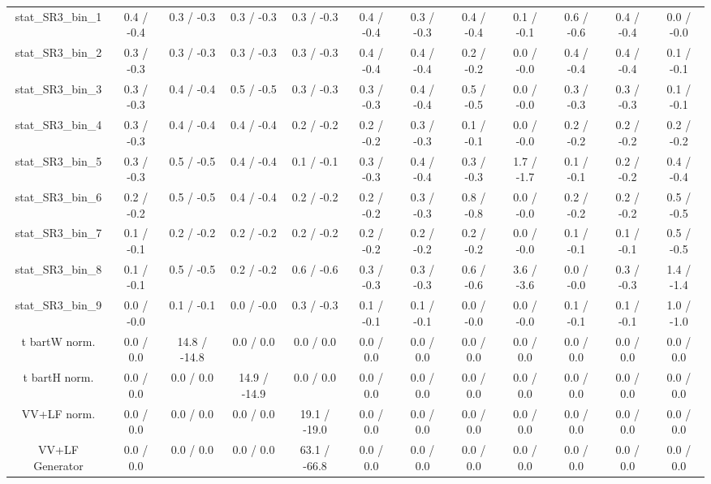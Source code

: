 \begin{table}[htbp]
\begin{center}
\begin{tabular}{|c|c|c|c|c|c|c|c|c|c|c|c|}
 stat_SR3_bin_1 & 0.4 / -0.4 & 0.3 / -0.3 & 0.3 / -0.3 & 0.3 / -0.3 & 0.4 / -0.4 & 0.3 / -0.3 & 0.4 / -0.4 & 0.1 / -0.1 & 0.6 / -0.6 & 0.4 / -0.4 & 0.0 / -0.0 \\ 
 stat_SR3_bin_2 & 0.3 / -0.3 & 0.3 / -0.3 & 0.3 / -0.3 & 0.3 / -0.3 & 0.4 / -0.4 & 0.4 / -0.4 & 0.2 / -0.2 & 0.0 / -0.0 & 0.4 / -0.4 & 0.4 / -0.4 & 0.1 / -0.1 \\ 
 stat_SR3_bin_3 & 0.3 / -0.3 & 0.4 / -0.4 & 0.5 / -0.5 & 0.3 / -0.3 & 0.3 / -0.3 & 0.4 / -0.4 & 0.5 / -0.5 & 0.0 / -0.0 & 0.3 / -0.3 & 0.3 / -0.3 & 0.1 / -0.1 \\ 
 stat_SR3_bin_4 & 0.3 / -0.3 & 0.4 / -0.4 & 0.4 / -0.4 & 0.2 / -0.2 & 0.2 / -0.2 & 0.3 / -0.3 & 0.1 / -0.1 & 0.0 / -0.0 & 0.2 / -0.2 & 0.2 / -0.2 & 0.2 / -0.2 \\ 
 stat_SR3_bin_5 & 0.3 / -0.3 & 0.5 / -0.5 & 0.4 / -0.4 & 0.1 / -0.1 & 0.3 / -0.3 & 0.4 / -0.4 & 0.3 / -0.3 & 1.7 / -1.7 & 0.1 / -0.1 & 0.2 / -0.2 & 0.4 / -0.4 \\ 
 stat_SR3_bin_6 & 0.2 / -0.2 & 0.5 / -0.5 & 0.4 / -0.4 & 0.2 / -0.2 & 0.2 / -0.2 & 0.3 / -0.3 & 0.8 / -0.8 & 0.0 / -0.0 & 0.2 / -0.2 & 0.2 / -0.2 & 0.5 / -0.5 \\ 
 stat_SR3_bin_7 & 0.1 / -0.1 & 0.2 / -0.2 & 0.2 / -0.2 & 0.2 / -0.2 & 0.2 / -0.2 & 0.2 / -0.2 & 0.2 / -0.2 & 0.0 / -0.0 & 0.1 / -0.1 & 0.1 / -0.1 & 0.5 / -0.5 \\ 
 stat_SR3_bin_8 & 0.1 / -0.1 & 0.5 / -0.5 & 0.2 / -0.2 & 0.6 / -0.6 & 0.3 / -0.3 & 0.3 / -0.3 & 0.6 / -0.6 & 3.6 / -3.6 & 0.0 / -0.0 & 0.3 / -0.3 & 1.4 / -1.4 \\ 
 stat_SR3_bin_9 & 0.0 / -0.0 & 0.1 / -0.1 & 0.0 / -0.0 & 0.3 / -0.3 & 0.1 / -0.1 & 0.1 / -0.1 & 0.0 / -0.0 & 0.0 / -0.0 & 0.1 / -0.1 & 0.1 / -0.1 & 1.0 / -1.0 \\ 
  t bar{t}W norm. & 0.0 / 0.0 & 14.8 / -14.8 & 0.0 / 0.0 & 0.0 / 0.0 & 0.0 / 0.0 & 0.0 / 0.0 & 0.0 / 0.0 & 0.0 / 0.0 & 0.0 / 0.0 & 0.0 / 0.0 & 0.0 / 0.0 \\ 
  t bar{t}H norm. & 0.0 / 0.0 & 0.0 / 0.0 & 14.9 / -14.9 & 0.0 / 0.0 & 0.0 / 0.0 & 0.0 / 0.0 & 0.0 / 0.0 & 0.0 / 0.0 & 0.0 / 0.0 & 0.0 / 0.0 & 0.0 / 0.0 \\ 
  VV+LF norm. & 0.0 / 0.0 & 0.0 / 0.0 & 0.0 / 0.0 & 19.1 / -19.0 & 0.0 / 0.0 & 0.0 / 0.0 & 0.0 / 0.0 & 0.0 / 0.0 & 0.0 / 0.0 & 0.0 / 0.0 & 0.0 / 0.0 \\ 
  VV+LF Generator & 0.0 / 0.0 & 0.0 / 0.0 & 0.0 / 0.0 & 63.1 / -66.8 & 0.0 / 0.0 & 0.0 / 0.0 & 0.0 / 0.0 & 0.0 / 0.0 & 0.0 / 0.0 & 0.0 / 0.0 & 0.0 / 0.0 \\ 

\end{tabular}
\end{center}
\end{table}
